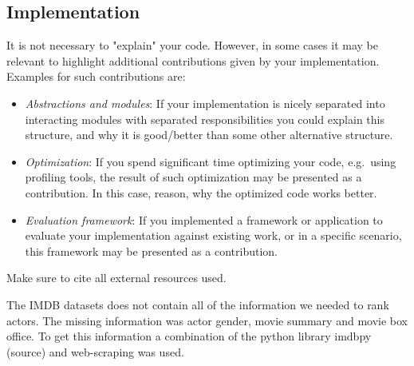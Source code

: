 \subsection{Implementation} It is not necessary to "explain" your code. 
However, in some cases it may be relevant to highlight 
additional contributions given by your implementation.
Examples for such contributions are:
\begin{itemize}
\item \emph{Abstractions and modules}: If your implementation is nicely separated into interacting
modules with separated responsibilities you could explain this structure,
and why it is good/better than some other alternative structure.
\item \emph{Optimization}: If you spend significant time optimizing your code, e.g.~using profiling tools,
the result of such optimization may be presented as a contribution. In this case, reason, 
why the optimized code works better.
\item \emph{Evaluation framework}: If you implemented a framework or application to evaluate your implementation against existing work, or in a specific scenario, this framework may be presented as a contribution.
\end{itemize}

Make sure to cite all external resources used.





The IMDB datasets does not contain all of the information we needed to rank actors. The missing information was actor gender,
movie summary and movie box office. To get this information a combination of the python library imdbpy (source) and web-scraping was used.
